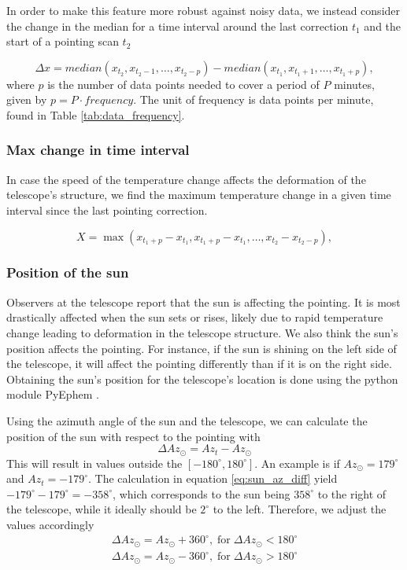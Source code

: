 In order to make this feature more robust against noisy data,
we instead consider the change in the median for a time interval around the last correction $t_1$ and the start of a pointing scan $t_2$

\begin{equation}
    \Delta x = \textit{median}(x_{t_2}, x_{t_2 - 1}, \dots, x_{t_2- p}) - \textit{median}(x_{t_1}, x_{t_1 + 1}, \dots, x_{t_1 + p}),
\end{equation}
where $p$ is the number of data points needed to cover a period of $P$ minutes, given by $p = P \cdot frequency$. The unit of frequency is data points per minute, found in Table \ref{tab:data_frequency}.

\subsubsection{Max change in time interval}
In case the speed of the temperature change affects the deformation of the telescope's structure, we find the maximum temperature change in a given time interval since the last pointing correction.

\begin{equation}
    X = \max (x_{t_1+p} - x_{t_1}, x_{t_1+p} - x_{t_1}, \dots, x_{t_2} - x_{t_2-p}),
\end{equation}


\subsubsection{Position of the sun}
Observers at the telescope report that the sun is affecting the pointing.
It is most drastically affected when the sun sets or rises, likely due to rapid temperature change leading to deformation in the telescope structure.
We also think the sun's position affects the pointing.
For instance, if the sun is shining on the left side of the telescope, it will affect the pointing differently than if it is on the right side.
Obtaining the sun's position for the telescope's location is done using the python module PyEphem \cite{ephem}.

Using the azimuth angle of the sun and the telescope, we can calculate the position of the sun with respect to the pointing with
\begin{equation}\label{eq:sun_az_diff}
    \Delta \textit{Az}_\odot = \textit{Az}_{\textit{t}} - \textit{Az}_\odot
\end{equation}
This will result in values outside the $[-180^\circ,180^\circ]$. An example is if $Az_\odot=179^\circ$ and $Az_t = -179^\circ$.
The calculation in equation \eqref{eq:sun_az_diff} yield $-179^\circ-179^\circ=-358^\circ$,
which corresponds to the sun being $358^\circ$ to the right of the telescope, while it ideally should be $2^\circ$ to the left.
Therefore, we adjust the values accordingly
\begin{align}
    \Delta Az_\odot = Az_\odot +360^\circ, \; \text{for} \; \Delta Az_\odot < 180^\circ\\
    \Delta Az_\odot = Az_\odot -360^\circ, \; \text{for} \; \Delta Az_\odot > 180^\circ
\end{align}

